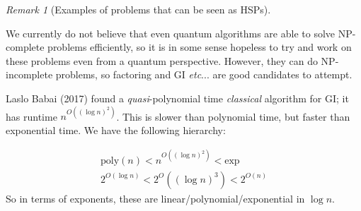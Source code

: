 \documentclass[]{article}
\theoremstyle{custhm}
\theoremstyle{cusdef}
\theoremstyle{custhm}
\theoremstyle{custhm}
\theoremstyle{custhm}
\theoremstyle{custhm}
\theoremstyle{cusdef}
\theoremstyle{remark}
\newtheorem*{remark*}{Remark}
\renewcommand{\it}[1]{\textit{#1}}
\newcommand{\poly}{\textrm{poly}}
\begin{document}
\begin{remark*}[Examples of problems that can be seen as HSPs]
\begin{enumerate}[label = (\alph*)]
	We currently do not believe that even quantum algorithms are able to solve NP-complete problems efficiently, so it is in some sense hopeless to try and work on these problems even from a quantum perspective. However, they can do NP-incomplete problems, so factoring and GI \it{etc}... are good candidates to attempt.
	
	Laslo Babai (2017) found a \it{quasi}-polynomial time \it{classical} algorithm for GI; it has runtime $n^{O((\log n)^2)}$. This is slower than polynomial time, but faster than exponential time. We have the following hierarchy:
	
	\begin{align*}
		\poly (n) < n^{O((\log n)^2)} < \textrm{exp}\\
		2^{O(\log n)} < 2^O((\log n)^3) < 2^{O(n)}
	\end{align*}
So in terms of exponents, these are linear/polynomial/exponential in $\log n$.
	
\end{enumerate}
\end{remark*}
\end{document}
